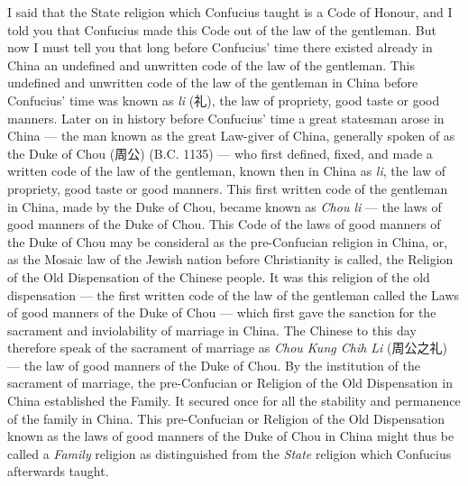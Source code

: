 I said that the State religion which Confucius taught is a Code of Honour, and I told you that Confucius made this Code out of the law of the gentleman.
But now I must tell you that long before Confucius' time there existed already in China an undefined and unwritten code of the law of the gentleman.
This undefined and unwritten code of the law of the gentleman in China before Confucius' time was known as \emph{li} (礼), the law of propriety, good taste or good manners.
Later on in history before Confucius' time a great statesman arose in China --- the man known as the great Law-giver of China, generally spoken of as the Duke of Chou (周公) (B.C. 1135)  --- who first defined, fixed, and made a written code of the law of the gentleman, known then in China as \emph{li}, the law of propriety, good taste or good manners.
This first written code of the gentleman in China, made by the Duke of Chou, became known as \emph{Chou li} --- the laws of good manners of the Duke of Chou.
This Code of the laws of good manners of the Duke of Chou may be consideral as the pre-Confucian religion in China, or, as the Mosaic law of the Jewish  nation before Christianity is called, the Religion of the Old Dispensation of the Chinese people. 
It was this religion of the old dispensation --- the first written code of the law of the gentleman called the Laws of good manners of the Duke of Chou --- which first gave the sanction for the sacrament and inviolability of marriage in China.
The Chinese to this day therefore speak of the sacrament of marriage as {\em{Chou Kung Chih Li}} (周公之礼) --- the law of good manners of the Duke of Chou.
By the institution of the sacrament of marriage, the pre-Confucian or Religion of the Old Dispensation in China established the Family.
It secured once for all the stability and permanence of the family in China.
This pre-Confucian or Religion of the Old Dispensation known as the laws of good manners of the Duke of Chou in China might thus be called a \emph{Family} religion as distinguished from the \emph{State} religion which Confucius afterwards taught.

